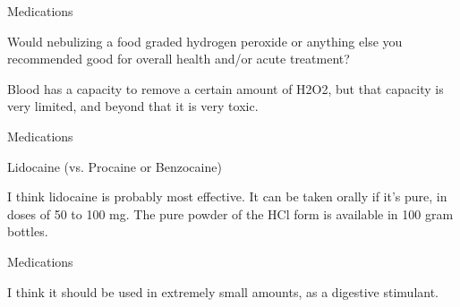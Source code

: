\documentclass[11pt,oneside,openany,extrafontsizes]{memoir}
\begin{document}
\begin{qaexchange}{Medications}

    \begin{question}
        Would nebulizing a food graded hydrogen peroxide or anything else you recommended good for overall health and/or acute treatment?
    \end{question}

    \begin{answer}
        Blood has a capacity to remove a certain amount of H2O2, but that capacity is very limited, and beyond that it is very toxic.
    \end{answer}
\end{qaexchange}

\begin{standalonequote}{Medications}

    \begin{note}
        Lidocaine (vs. Procaine or Benzocaine)
    \end{note}

    \begin{answer}
        I think lidocaine is probably most effective. It can be taken orally if it's pure, in doses of 50 to 100 mg. The pure powder of the HCl form is available in 100 gram bottles.
    \end{answer}
\end{standalonequote}

\begin{standalonequote}{Medications}

    \begin{answer}
        I think it should be used in extremely small amounts, as a digestive stimulant.
    \end{answer}
\end{standalonequote}
\end{document}
